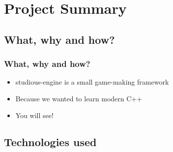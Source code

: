 \documentclass{beamer}
\begin{document}
\section{Project Summary}

\subsection{What, why and how?}

\begin{frame}
\frametitle{What, why and how?}
\begin{itemize}
\item studious-engine is a small game-making framework
\item Because we wanted to learn modern C++
\item You will see!
\end{itemize}

\end{frame}

\subsection{Technologies used}
\end{document}
